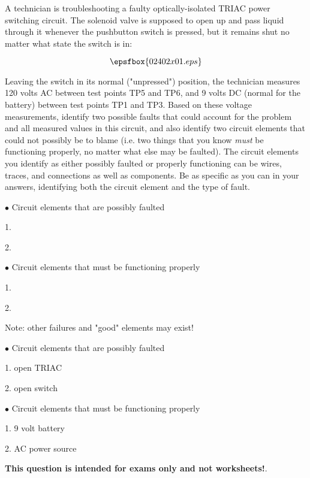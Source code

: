 

A technician is troubleshooting a faulty optically-isolated TRIAC power switching circuit.  The solenoid valve is supposed to open up and pass liquid through it whenever the pushbutton switch is pressed, but it remains shut no matter what state the switch is in:

$$\epsfbox{02402x01.eps}$$

Leaving the switch in its normal ("unpressed") position, the technician measures 120 volts AC between test points TP5 and TP6, and 9 volts DC (normal for the battery) between test points TP1 and TP3.  Based on these voltage measurements, identify two possible faults that could account for the problem and all measured values in this circuit, and also identify two circuit elements that could not possibly be to blame (i.e. two things that you know {\it must} be functioning properly, no matter what else may be faulted).  The circuit elements you identify as either possibly faulted or properly functioning can be wires, traces, and connections as well as components.  Be as specific as you can in your answers, identifying both the circuit element and the type of fault.

\medskip
\item{$\bullet$} Circuit elements that are possibly faulted
\item{1.} 
\item{2.} 
\medskip

\medskip
\item{$\bullet$} Circuit elements that must be functioning properly
\item{1.} 
\item{2.} 
\medskip







Note: other failures and "good" elements may exist!

\medskip
\item{$\bullet$} Circuit elements that are possibly faulted
\item{1.} open TRIAC 
\item{2.} open switch
\medskip

\medskip
\item{$\bullet$} Circuit elements that must be functioning properly
\item{1.} 9 volt battery
\item{2.} AC power source
\medskip







{\bf This question is intended for exams only and not worksheets!}.




